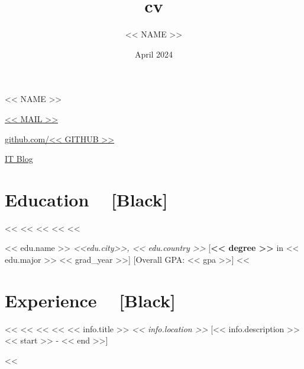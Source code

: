 \documentclass[10pt, a4paper]{article}
\title{cv}
\author{<< NAME >>}
\date{April 2024}
\newcommand{\myname}[1]{
        \begin{center}
            {\LARGE #1}
        \end{center}
    }
\newcommand{\mysec}[1]{\section*{\textbf{#1 ~} \xrfill[0.3\baselineskip]{0.1pt}[Black]}}
\newcommand{\hl}[1]{\textit{\color{Mahogany} #1}}
\begin{document}

    \myname{<< NAME >>} %
    
    \begin{center}
        \begin{linkset}
            \item \href{mailto:<< MAIL >>}{<< MAIL >>}
            \item \href{https://github.com/<< GITHUB >>}{github.com/<< GITHUB >>}
            \item \href{<< IT_BLOG >>}{IT Blog}
        \end{linkset}
    \end{center}

    
    \mysec{Education} %
        <<%
            <<%
            <<%
            <<%
            <<%

            \myitem
                {<< edu.name >> \hfill \hl{<<edu.city>>, << edu.country >>}}
                [\textbf{<< degree >>} in << edu.major >> \hfill \small << grad_year >>]
                [Overall GPA: << gpa >>]
        <<%


    \mysec{Experience} %
        <<%
            <<%
            <<%
            <<%
            \myitem
                {<< info.title >> \hfill \hl{<< info.location >>}}
                [<< info.description >> \hfill \small << start >> - << end >>]

        <<%
    
\end{document}
